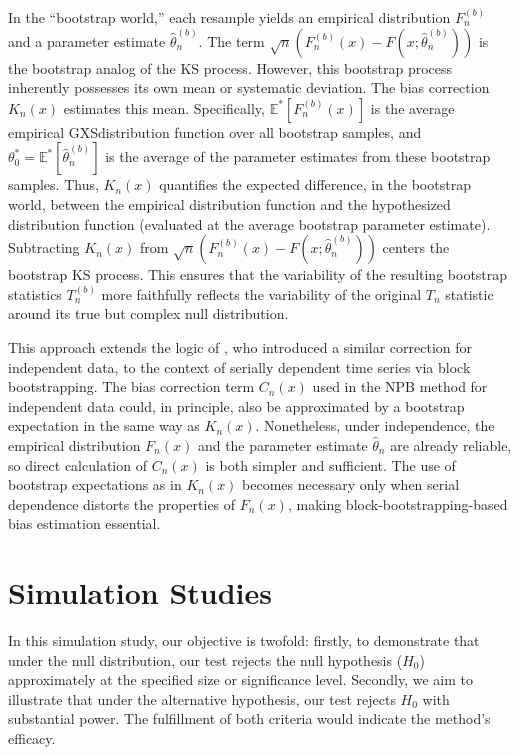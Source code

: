 \documentclass[12pt]{article}
\begin{document}
In the ``bootstrap world,'' each resample yields an empirical distribution 
$F_n^{(b)}$ and a parameter estimate $\hat\theta^{(b)}_n$. The term 
$\sqrt{n}(F_n^{(b)}(x) - F(x;\hat\theta^{(b)}_n))$ is the bootstrap analog of 
the KS process. However, this bootstrap process inherently possesses its own 
mean or systematic deviation. The bias correction $K_n(x)$
estimates this mean.
Specifically, $\mathbb{E}^*[F_n^{(b)}(x)]$ is the average empirical
GXSdistribution function over all bootstrap samples, and
$\theta^*_0 = \mathbb{E}^*[\hat\theta^{(b)}_n]$ is the average of 
the parameter estimates from these bootstrap samples. Thus,
$K_n(x)$ quantifies 
the expected difference, in the bootstrap world, between the empirical
distribution function and the hypothesized distribution function
(evaluated at the average bootstrap parameter estimate).
Subtracting $K_n(x)$ from
$\sqrt{n}(F_n^{(b)}(x) - F(x;\hat\theta^{(b)}_n))$ centers the 
bootstrap KS process. This ensures that the variability of the resulting 
bootstrap statistics $T_n^{(b)}$ more faithfully reflects the variability of 
the original $T_n$ statistic around its true but complex null
distribution.


This approach extends the logic of \citet{babu2004goodness}, who
introduced a similar correction for independent data, to the context
of serially dependent time series via block bootstrapping.
The bias correction term $C_n(x)$ used in the NPB method for
independent data could, in principle, also be approximated by a
bootstrap expectation in the same way as $K_n(x)$.
Nonetheless, under independence, the empirical distribution $F_n(x)$
and the parameter estimate $\hat{\theta}_n$ are already reliable, so
direct calculation of $C_n(x)$ is both simpler and sufficient. The use
of bootstrap expectations as in $K_n(x)$ becomes necessary only when
serial dependence distorts the properties of $F_n(x)$, making
block-bootstrapping-based bias estimation essential.


\section{Simulation Studies}\label{sec:simu}

In this simulation study, our objective is twofold: firstly, to demonstrate that
under the null distribution, our test rejects the null hypothesis ($H_0$)
approximately at the specified size or significance level. Secondly, we aim to
illustrate that under the alternative hypothesis, our test rejects
$H_0$ with substantial power. The fulfillment of both criteria would indicate
the method's efficacy.
\end{document}

